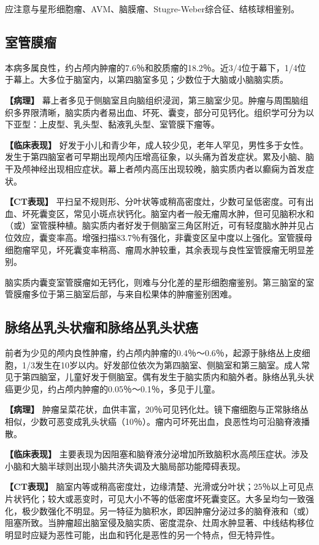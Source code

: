 应注意与星形细胞瘤、AVM、脑膜瘤、Stugre-Weber综合征、结核球相鉴别。

\subsection{室管膜瘤}

本病多属良性，约占颅内肿瘤的7.6％和胶质瘤的18.2％。近3/4位于幕下，1/4位于幕上。大多位于脑室内，以第四脑室多见；少数位于大脑或小脑脑实质。

\textbf{【病理】}
幕上者多见于侧脑室且向脑组织浸润，第三脑室少见。肿瘤与周围脑组织多界限清晰，脑实质内者易出血、坏死、囊变，部分可见钙化。组织学可分为以下亚型：上皮型、乳头型、黏液乳头型、室管膜下瘤等。

\textbf{【临床表现】}
好发于小儿和青少年，成人较少见，老年人罕见，男性多于女性。发生于第四脑室者可早期出现颅内压增高征象，以头痛为首发症状。累及小脑、脑干及颅神经出现相应症状。幕上者颅内高压出现较晚，脑实质内者以癫痫为首发症状。

\textbf{【CT表现】}
平扫呈不规则形、分叶状等或稍高密度灶，少数可呈低密度。可有出血、坏死囊变区，常见小斑点状钙化。脑室内者一般无瘤周水肿，但可见脑积水和（或）室管膜种植。脑实质内者好发于侧脑室三角区附近，可有轻度脑水肿并见占位效应，囊变率高。增强扫描83.7％有强化，非囊变区呈中度以上强化。室管膜母细胞瘤罕见，坏死囊变率稍高、瘤周水肿较重，其余表现与良性室管膜瘤无明显差别。

脑实质内囊变室管膜瘤如无钙化，则难与分化差的星形细胞瘤鉴别。第三脑室的室管膜瘤多位于第三脑室后部，与来自松果体的肿瘤鉴别困难。

\subsection{脉络丛乳头状瘤和脉络丛乳头状癌}

前者为少见的颅内良性肿瘤，约占颅内肿瘤的0.4％～0.6％，起源于脉络丛上皮细胞，1/3发生在10岁以内。好发部位依次为第四脑室、侧脑室和第三脑室。成人常见于第四脑室，儿童好发于侧脑室。偶有发生于脑实质内和脑外者。脉络丛乳头状癌更少见，约占颅内肿瘤的0.05％～0.1％，多见于儿童。

\textbf{【病理】}
肿瘤呈菜花状，血供丰富，20％可见钙化灶。镜下瘤细胞与正常脉络丛相似，少数可恶变成乳头状癌（10％）。瘤内可坏死出血，良恶性均可沿脑脊液播散。

\textbf{【临床表现】}
主要表现为因阻塞和脑脊液分泌增加所致脑积水高颅压症状。涉及小脑和大脑半球则出现小脑共济失调及大脑局部功能障碍表现。

\textbf{【CT表现】}
脑室内等或稍高密度灶，边缘清楚、光滑或分叶状；25％以上可见点片状钙化；较大或恶变时，可见大小不等的低密度坏死囊变区。大多呈均匀一致强化，极少数强化不明显。另一特征为脑积水，即因肿瘤分泌过多的脑脊液和（或）阻塞所致。当肿瘤超出脑室侵及脑实质、密度混杂、灶周水肿显著、中线结构移位明显时应疑为恶性可能，出血和钙化是恶性的另一个特点，但无特异性。

